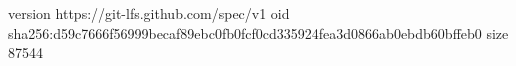version https://git-lfs.github.com/spec/v1
oid sha256:d59c7666f56999becaf89ebc0fb0fcf0cd335924fea3d0866ab0ebdb60bffeb0
size 87544
